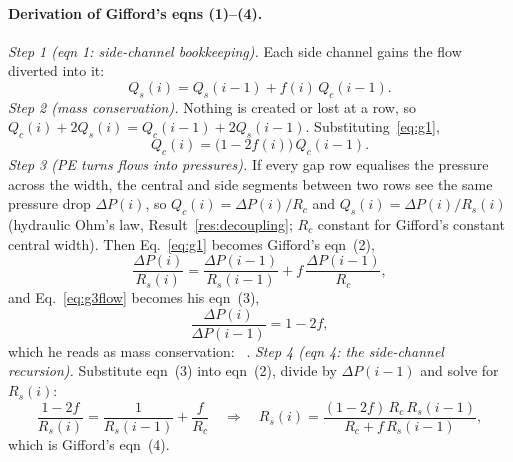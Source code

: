 \paragraph{Derivation of Gifford's eqns (1)--(4).}
\emph{Step 1 (eqn 1: side-channel bookkeeping).} Each side channel gains the flow diverted
into it:
\begin{equation}
Q_s(i) = Q_s(i-1) + f(i)\,Q_c(i-1).
\label{eq:g1}
\end{equation}
\emph{Step 2 (mass conservation).} Nothing is created or lost at a row, so
$Q_c(i)+2Q_s(i)=Q_c(i-1)+2Q_s(i-1)$. Substituting~\eqref{eq:g1},
\begin{equation}
Q_c(i) = \big(1-2f(i)\big)\,Q_c(i-1).
\label{eq:g3flow}
\end{equation}
\emph{Step 3 (PE turns flows into pressures).} If every gap row equalises the pressure across
the width, the central and side segments between two rows see the same pressure drop
$\Delta P(i)$, so $Q_c(i)=\Delta P(i)/R_c$ and $Q_s(i)=\Delta P(i)/R_s(i)$ (hydraulic Ohm's law,
Result~\ref{res:decoupling}; $R_c$ constant for Gifford's constant central width). Then
Eq.~\eqref{eq:g1} becomes Gifford's eqn~(2),
\begin{equation}
\frac{\Delta P(i)}{R_s(i)} = \frac{\Delta P(i-1)}{R_s(i-1)} + f\,\frac{\Delta P(i-1)}{R_c},
\end{equation}
and Eq.~\eqref{eq:g3flow} becomes his eqn~(3),
\begin{equation}
\frac{\Delta P(i)}{\Delta P(i-1)} = 1-2f ,
\end{equation}
which he reads as mass conservation: ~\cite[p.~4498]{b1}.
\emph{Step 4 (eqn 4: the side-channel recursion).} Substitute eqn~(3) into eqn~(2), divide by
$\Delta P(i-1)$ and solve for $R_s(i)$:
\begin{equation}
\frac{1-2f}{R_s(i)}=\frac{1}{R_s(i-1)}+\frac{f}{R_c}
\quad\Longrightarrow\quad
R_s(i) = \frac{(1-2f)\,R_c\,R_s(i-1)}{R_c + f\,R_s(i-1)} ,
\label{eq:g4}
\end{equation}
which is Gifford's eqn~(4).

